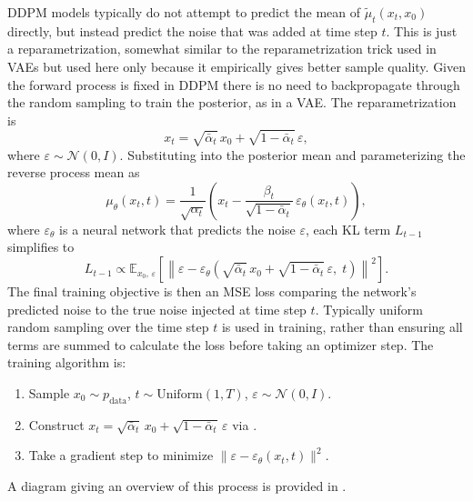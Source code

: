 DDPM models typically do not attempt to predict the mean of $\tilde\mu_t(x_t, x_0)$ directly, but instead predict the noise that was added at time step $t$.
This is just a reparametrization, somewhat similar to the reparametrization trick used in VAEs but used here only because it empirically gives better sample quality.
Given the forward process is fixed in DDPM there is no need to backpropagate through the random sampling to train the posterior, as in a VAE.
The reparametrization is
\begin{equation}
    x_t = \sqrt{\bar\alpha_t}\,x_0 + \sqrt{1 - \bar\alpha_t}\,\varepsilon,
    \label{eqn:xt_reparam}
\end{equation}
where $\varepsilon \sim \mathcal{N}(0, I)$.
Substituting  into the posterior mean  and parameterizing the reverse process mean as
\begin{equation}
    \mu_\theta(x_t, t)
    = \frac{1}{\sqrt{\alpha_t}}\!\left(x_t - \frac{\beta_t}{\sqrt{1 - \bar\alpha_t}}\,\varepsilon_\theta(x_t, t)\right),
    \label{eqn:reverse_mean_reparam}
\end{equation}
where $\varepsilon_\theta$ is a neural network that predicts the noise $\varepsilon$, each KL term $L_{t-1}$ simplifies to
\begin{equation}
    L_{t-1} \propto \mathbb{E}_{x_0,\,\varepsilon}\!\left[\left\|\varepsilon - \varepsilon_\theta\!\left(\sqrt{\bar\alpha_t}\,x_0 + \sqrt{1-\bar\alpha_t}\,\varepsilon,\; t\right)\right\|^2\right].
    \label{eqn:ddpm_loss}
\end{equation}
The final training objective is then an MSE loss comparing the network's predicted noise to the true noise injected at time step $t$.
Typically uniform random sampling over the time step $t$ is used in training, rather than ensuring all terms are summed to calculate the loss before taking an optimizer step.
The training algorithm is:
\begin{enumerate}
    \item Sample $x_0 \sim p_\text{data}$, $t \sim \text{Uniform}(1, T)$, $\varepsilon \sim \mathcal{N}(0, I)$.
    \item Construct $x_t = \sqrt{\bar\alpha_t}\,x_0 + \sqrt{1 - \bar\alpha_t}\,\varepsilon$ via .
    \item Take a gradient step to minimize $\|\varepsilon - \varepsilon_\theta(x_t, t)\|^2$.
\end{enumerate}
A diagram giving an overview of this process is provided in .

